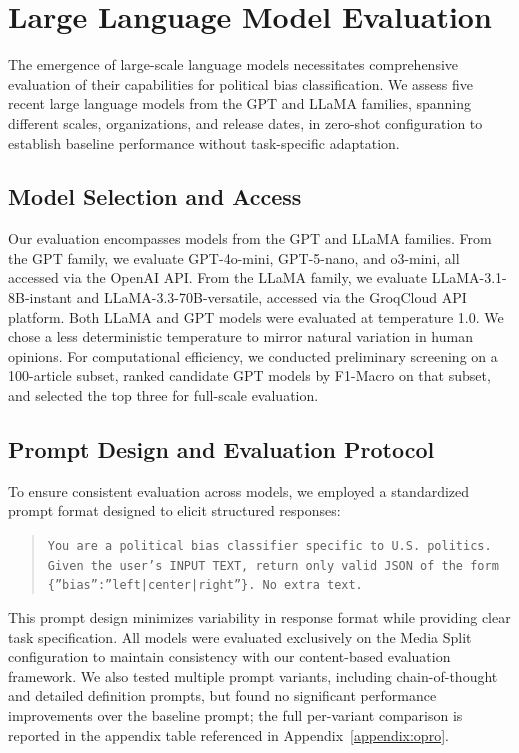 

\section{Large Language Model Evaluation}
\label{sec:llm-baselines}

The emergence of large-scale language models necessitates comprehensive evaluation of their capabilities for political bias classification. We assess five recent large language models from the GPT \citep{openai2024gpt4,openai_o3_systemcard_2025,openai_gpt5_systemcard_2025} and LLaMA \citep{touvron2023llama} families, spanning different scales, organizations, and release dates, in zero-shot configuration to establish baseline performance without task-specific adaptation.

\subsection{Model Selection and Access}

Our evaluation encompasses models from the GPT and LLaMA families. From the GPT family, we evaluate GPT-4o-mini, GPT-5-nano, and o3-mini, all accessed via the OpenAI API. From the LLaMA family, we evaluate LLaMA-3.1-8B-instant and LLaMA-3.3-70B-versatile, accessed via the GroqCloud API platform. Both LLaMA and GPT models were evaluated at temperature 1.0. We chose a less deterministic temperature to mirror natural variation in human opinions. For computational efficiency, we conducted preliminary screening on a 100-article subset, ranked candidate GPT models by F1-Macro on that subset, and selected the top three for full-scale evaluation.

\subsection{Prompt Design and Evaluation Protocol}

To ensure consistent evaluation across models, we employed a standardized prompt format designed to elicit structured responses:

\begin{quote}
\texttt{You are a political bias classifier specific to U.S. politics. Given the user's INPUT TEXT, return only valid JSON of the form \{''bias'':''left|center|right''\}. No extra text.}
\end{quote}

This prompt design minimizes variability in response format while providing clear task specification. All models were evaluated exclusively on the Media Split configuration to maintain consistency with our content-based evaluation framework. We also tested multiple prompt variants, including chain-of-thought and detailed definition prompts, but found no significant performance improvements over the baseline prompt; the full per-variant comparison is reported in the appendix table referenced in Appendix~\ref{appendix:opro}.

